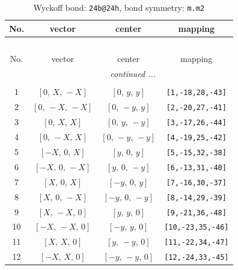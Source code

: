 \documentclass[fleqn,8pt]{jsarticle}
\begin{document}
\begin{longtable}{cccc}
\caption{Wyckoff bond: {\tt 24b@24h}, bond symmetry: {\tt m.m2}}
 \\
 \hline \hline
No. & vector & center & mapping \\ \hline \endfirsthead

\multicolumn{3}{l}{\tablename\ \thetable{}} \\
 \hline \hline
No. & vector & center & mapping \\ \hline \endhead

 \hline \hline
\multicolumn{3}{r}{\footnotesize\it continued ...} \\ \endfoot

 \hline \hline
\multicolumn{3}{r}{} \\ \endlastfoot

1 & $\left[ 0,\, X,\, - X \right]$ & $\left[ 0,\, y,\, y \right]$ & {\tt [1,-18,28,-43]} \\ \hline
2 & $\left[ 0,\, - X,\, - X \right]$ & $\left[ 0,\, - y,\, y \right]$ & {\tt [2,-20,27,-41]} \\ \hline
3 & $\left[ 0,\, X,\, X \right]$ & $\left[ 0,\, y,\, - y \right]$ & {\tt [3,-17,26,-44]} \\ \hline
4 & $\left[ 0,\, - X,\, X \right]$ & $\left[ 0,\, - y,\, - y \right]$ & {\tt [4,-19,25,-42]} \\ \hline
5 & $\left[ - X,\, 0,\, X \right]$ & $\left[ y,\, 0,\, y \right]$ & {\tt [5,-15,32,-38]} \\ \hline
6 & $\left[ - X,\, 0,\, - X \right]$ & $\left[ y,\, 0,\, - y \right]$ & {\tt [6,-13,31,-40]} \\ \hline
7 & $\left[ X,\, 0,\, X \right]$ & $\left[ - y,\, 0,\, y \right]$ & {\tt [7,-16,30,-37]} \\ \hline
8 & $\left[ X,\, 0,\, - X \right]$ & $\left[ - y,\, 0,\, - y \right]$ & {\tt [8,-14,29,-39]} \\ \hline
9 & $\left[ X,\, - X,\, 0 \right]$ & $\left[ y,\, y,\, 0 \right]$ & {\tt [9,-21,36,-48]} \\ \hline
10 & $\left[ - X,\, - X,\, 0 \right]$ & $\left[ - y,\, y,\, 0 \right]$ & {\tt [10,-23,35,-46]} \\ \hline
11 & $\left[ X,\, X,\, 0 \right]$ & $\left[ y,\, - y,\, 0 \right]$ & {\tt [11,-22,34,-47]} \\ \hline
12 & $\left[ - X,\, X,\, 0 \right]$ & $\left[ - y,\, - y,\, 0 \right]$ & {\tt [12,-24,33,-45]} \\
\end{longtable}
\renewcommand{\arraystretch}{1.2}
\end{document}
